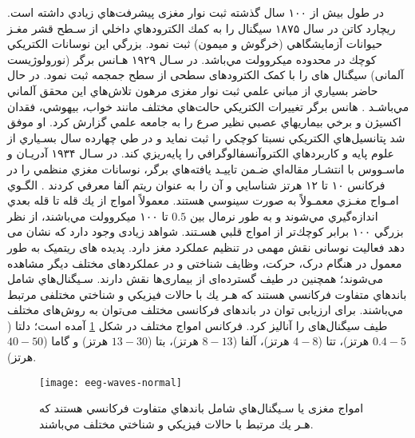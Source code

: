  در طول بيش از ۱۰۰ سال گذشته ثبت نوار مغزی 
 پيشرفت‌هاي زيادي داشته است. ريچارد كاتن
  در سال ۱۸۷۵ سيگنال
را به كمك الكترودهاي داخلي از سـطح قشر مغـز حيوانات آزمايشگاهي (خرگوش و ميمون) ثبت نمود. بزرگي اين  نوسانات الكتريكي كوچك در محدوده ميكروولت مي‌باشد. 
 در سـال ۱۹۲۹ هـانس برگر
  (نورولوژیست آلمانی) سیگنال های 
 را با کمک الکترودهای سطحی از سطح جمجمه ثبت نمود. در حال حاضر بسياري از مباني علمي ثبت نوار مغزی مرهون تلاش‌هاي اين محقق آلماني مي‌باشـد
\cite{ahmed2013finding, millet2002origins}.
هانس برگر تغييرات الكتريكي حالت‌هاي مختلف مانند خواب، بيهوشي، فقدان اكسيژن و برخي بيماريهاي عصبي نظير صرع را به جامعه علمي گزارش كرد. او موفق شد پتانسيل‌هاي الكتريكي نسبتا كوچكي را ثبت نمايد و در طي چهارده سال بسـياري از علوم پايه و كاربردهاي الكتروآنسفالوگرافي را پايه‌ريزي كند. در سـال ۱۹۳۴ آدريـان و ماسـووس با انتشـار مقاله‌اي ضـمن تاييـد يافته‌هاي برگر، نوسانات مغزي منظمي را در فرکانس ۱۰ تا ۱۲ هرتز شناسايي و آن را به عنوان ريتم آلفا معرفي كردند
\cite{ahmed2013finding, millet2002origins, adrian1934berger}.
   الگـوي امـواج مغـزي معمـولاً به صورت سينوسي هستند. معمولاً امواج از يك قله تا قله بعدي اندازه‌گيري مي‌شوند و به طور نرمال بين $0.5$ تا ۱۰۰ ميكروولت مي‌باشند، از نظر بزرگي ۱۰۰ برابر كوچك‌تر از امواج قلبي هسـتند. شواهد زیادی وجود دارد که نشان می دهد فعالیت نوسانی نقش مهمی در تنظیم عملکرد مغز دارد. پدیده های ریتمیک به طور معمول در هنگام درک، حرکت، وظایف شناختی و در عملکردهای مختلف دیگر مشاهده می‌شوند؛ همچنین در طیف گسترده‌ای از بیماری‌ها نقش دارند. سـيگنال‌هاي
 شامل باندهاي متفاوت فركانسي هستند كه هـر يك با حالات فيزيكي و شناختي مختلفی مرتبط مي‌باشند.
 برای ارزیابی توان در باندهای فرکانسی مختلف می‌توان به روش‌های مختلف طیف سیگنال‌های 
 را آنالیز کرد. فركانس امواج
مختلف در شكل 
\ref{fig:eegNormal}
 آمده است؛ دلتا ($0.4-5$ هرتز)، تتا ($4-8$ هرتز)، آلفا ($8-13$ هرتز)، بتا ($13-30$ هرتز) و گاما ($40-50$ هرتز).
\begin{figure}
    \centering
    \texttt{[image: eeg-waves-normal]}
    \caption{
امواج مغزی یا سـيگنال‌هاي
 شامل باندهاي متفاوت فركانسي هستند كه هـر يك مرتبط با حالات فيزيكي و شناختي مختلف مي‌باشند.
         }
    \label{fig:eegNormal}
\end{figure}
